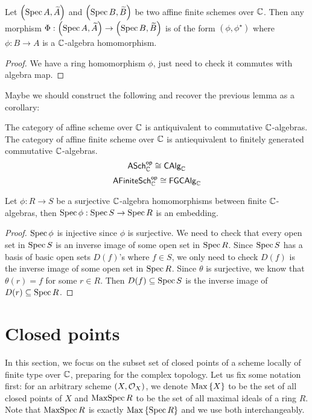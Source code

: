 \begin{proposition}
  Let $\left(\operatorname*{Spec}{A}, \widetilde{A}\right)$ and $\left(\operatorname*{Spec}{B}, \widetilde{B}\right)$ be two affine finite schemes over $\mathbb{C}$. Then any morphism $\Phi : \left(\operatorname*{Spec}{A}, \widetilde{A}\right) \to \left(\operatorname*{Spec}{B}, \widetilde{B}\right)$ is of the form $(\phi, \phi^{\star})$ where $\phi : B \to A$ is a $\mathbb{C}$-algebra homomorphism.
\end{proposition}

\begin{proof}
  We have a ring homomorphism $\phi$, just need to check it commutes with algebra map.
\end{proof}

Maybe we should construct the following and recover the previous lemma as a corollary:
\begin{proposition}
  The category of affine scheme over $\mathbb{C}$ is antiquivalent to commutative $\mathbb{C}$-algebras.
  The category of affine finite scheme over $\mathbb{C}$ is antiequivalent to finitely generated commutative $\mathbb{C}$-algebras.
  \[
    \mathsf{ASch}_{\mathbb{C}}^{\mathsf{op}}\cong \mathsf{CAlg}_{\mathbb{C}}
  \]
  \[
    \mathsf{AFiniteSch}_{\mathbb{C}}^{\mathsf{op}}\cong \mathsf{FGCAlg}_{\mathbb{C}}
  \]
\end{proposition}

\begin{lemma}\label{thm:surjective-alg-hom-induces-embedding-affine}
  Let $\phi : R \to S$ be a surjective $\mathbb{C}$-algebra homomorphisms between finite $\mathbb{C}$-algebras, then $\operatorname{Spec}\phi : \operatorname{Spec}{S} \to \operatorname{Spec}{R}$ is an embedding.
\end{lemma}
\begin{proof}
  $\operatorname{Spec}\phi$ is injective since $\phi$ is surjective. We need to check that every open set in $\operatorname{Spec} S$ is an inverse image of some open set in $\operatorname{Spec} R$. Since $\operatorname{Spec}{S}$ has a basis of basic open sets $D(f)$'s where $f \in S$, we only need to check $D(f)$ is the inverse image of some open set in $\operatorname{Spec} R$. Since $\theta$ is surjective, we know that $\theta(r) = f$ for some $r \in R$. Then $D(f) \subseteq \operatorname{Spec} S$ is the inverse image of $D(r) \subseteq \operatorname{Spec} R$.
\end{proof}

\section{Closed points}
In this section, we focus on the subset set of closed points of a scheme locally of finite type over $\mathbb{C}$, preparing for the complex topology. Let us fix some notation first: for an arbitrary scheme $\left(X, \mathcal{O}_{X}\right)$, we denote $\operatorname{Max}\left\{X\right\}$ to be the set of all closed points of $X$ and $\operatorname{MaxSpec} R$ to be the set of all maximal ideals of a ring $R$. Note that $\operatorname{MaxSpec} R$ is exactly $\operatorname{Max}\left\{\operatorname{Spec}{R}\right\}$ and we use both interchangeably.



